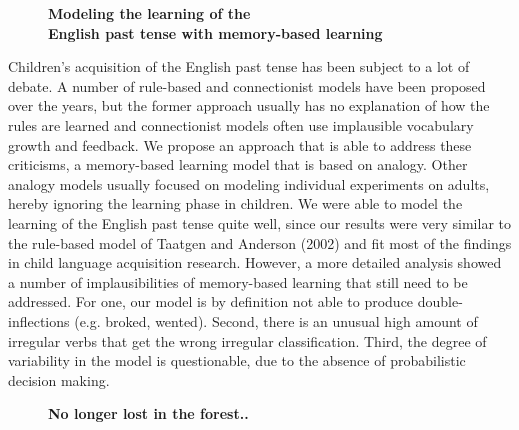 \documentclass[10pt, a4paper, twopage, headinclude, footinclude, BCOR5mm]{scrartcl}
\begin{document}
\newpage

\begin{figure}[t!]
\centering
\large\textbf{Modeling the learning of the \\ English past tense with memory-based learning}
\vspace*{0.5cm}
\end{figure}


        \begin{table}[t!]
    \end{table}

\noindent
Children's acquisition of the English past tense has been subject to a lot of debate. A number of rule-based and connectionist models have been proposed over the years, but the former approach usually has no explanation of how the rules are learned and connectionist models often use implausible vocabulary growth and feedback. We propose an approach that is able to address these criticisms, a memory-based learning model that is based on analogy. Other analogy models usually focused on modeling individual experiments on adults, hereby ignoring the learning phase in children. We were able to model the learning of the English past tense quite well, since our results were very similar to the rule-based model of Taatgen and Anderson (2002) and fit most of the findings in child language acquisition research. However, a more detailed analysis showed a number of implausibilities of memory-based learning that still need to be addressed. For one, our model is by definition not able to produce double-inflections (e.g. broked, wented). Second, there is an unusual high amount of irregular verbs that get the wrong irregular classification. Third, the degree of variability in the model is questionable, due to the absence of probabilistic decision making.


\newpage

\begin{figure}[t!]
\centering
\large\textbf{No longer lost in the forest..}
\vspace*{0.5cm}
\end{figure}
\end{document}
